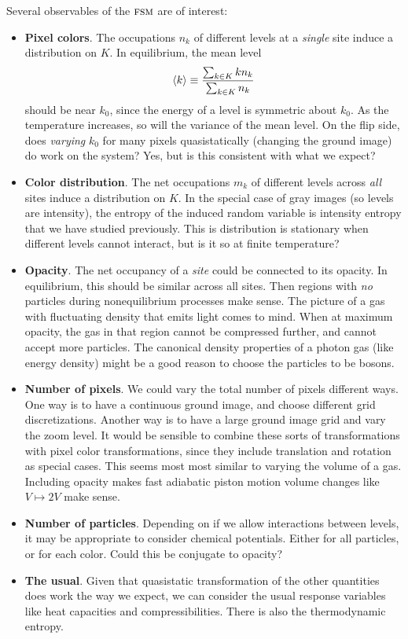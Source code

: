 \documentclass[../notebook.tex]{subfiles}
\begin{document}
Several observables of the $\textsc{fsm}$ are of interest:
\begin{itemize}
  \item \textbf{Pixel colors}. The occupations $n_k$ of different levels at a
    \emph{single} site induce a distribution on $K$. In equilibrium, the mean
    level
    \[
      \ev{k}
      \equiv \frac{\sum_{k \in K} k n_k}{\sum_{k \in K} n_k}
    \]
    should be near $k_0$, since the energy of a level is symmetric about $k_0$.
    As the temperature increases, so will the variance of the mean level. On the
    flip side, does \emph{varying} $k_0$ for many pixels quasistatically
    (changing the ground image) do work on the system? Yes, but is this
    consistent with what we expect?

  \item \textbf{Color distribution}. The net occupations $m_k$ of different
    levels across \emph{all} sites induce a distribution on $K$. In the special
    case of gray images (so levels are intensity), the entropy of the induced
    random variable is intensity entropy that we have studied previously. This
    is distribution is stationary when different levels cannot interact, but is
    it so at finite temperature?
    
  \item \textbf{Opacity}. The net occupancy of a \emph{site} could be connected
    to its opacity. In equilibrium, this should be similar across all sites.
    Then regions with \emph{no} particles during nonequilibrium processes make
    sense. The picture of a gas with fluctuating density that emits light comes
    to mind. When at maximum opacity, the gas in that region cannot be
    compressed further, and cannot accept more particles. The canonical density
    properties of a photon gas (like energy density) might be a good reason to
    choose the particles to be bosons.

  \item \textbf{Number of pixels}. We could vary the total number of pixels
    different ways. One way is to have a continuous ground image, and choose
    different grid discretizations. Another way is to have a large ground image
    grid and vary the zoom level. It would be sensible to combine these sorts of
    transformations with pixel color transformations, since they include
    translation and rotation as special cases. This seems most most similar to
    varying the volume of a gas. Including opacity makes fast adiabatic piston
    motion volume changes like $V \mapsto 2V$ make sense.

  \item \textbf{Number of particles}. Depending on if we allow interactions
    between levels, it may be appropriate to consider chemical potentials.
    Either for all particles, or for each color. Could this be conjugate to
    opacity?

  \item \textbf{The usual}. Given that quasistatic transformation of the other
    quantities does work the way we expect, we can consider the usual response
    variables like heat capacities and compressibilities. There is also the
    thermodynamic entropy.
\end{itemize}
\end{document}
